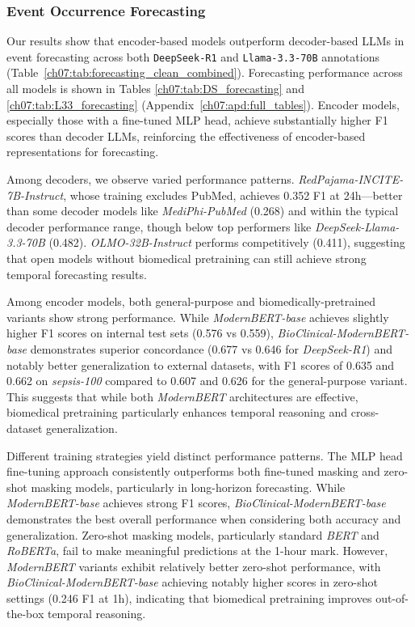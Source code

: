 \subsubsection{Event Occurrence Forecasting}\label{ch07:sec:event-results}

Our results show that encoder-based models outperform decoder-based LLMs in event forecasting across both \texttt{DeepSeek-R1} and \texttt{Llama-3.3-70B} annotations (Table~\ref{ch07:tab:forecasting_clean_combined}).
Forecasting performance across all models is shown in Tables \ref{ch07:tab:DS_forecasting} and \ref{ch07:tab:L33_forecasting} (Appendix~\ref{ch07:apd:full_tables}).
Encoder models, especially those with a fine-tuned MLP head, achieve substantially higher F1 scores than decoder LLMs, reinforcing the effectiveness of encoder-based representations for forecasting.



Among decoders, we observe varied performance patterns. \textit{RedPajama-INCITE-7B-Instruct}, whose training excludes PubMed, achieves 0.352 F1 at 24h---better than some decoder models like \textit{MediPhi-PubMed} (0.268) and within the typical decoder performance range, though below top performers like \textit{DeepSeek-Llama-3.3-70B} (0.482). \textit{OLMO-32B-Instruct} performs competitively (0.411), suggesting that open models without biomedical pretraining can still achieve strong temporal forecasting results.

Among encoder models, both general-purpose and biomedically-pretrained variants show strong performance.
While \textit{ModernBERT-base} achieves slightly higher F1 scores on internal test sets (0.576 vs 0.559), \textit{BioClinical-ModernBERT-base} demonstrates superior concordance (0.677 vs 0.646 for \textit{DeepSeek-R1}) and notably better generalization to external datasets, with F1 scores of 0.635 and 0.662 on \textit{sepsis-100} compared to 0.607 and 0.626 for the general-purpose variant.
This suggests that while both \textit{ModernBERT} architectures are effective, biomedical pretraining particularly enhances temporal reasoning and cross-dataset generalization.

Different training strategies yield distinct performance patterns.
The MLP head fine-tuning approach consistently outperforms both fine-tuned masking and zero-shot masking models, particularly in long-horizon forecasting.
While \textit{ModernBERT-base} achieves strong F1 scores, \textit{BioClinical-ModernBERT-base} demonstrates the best overall performance when considering both accuracy and generalization.
Zero-shot masking models, particularly standard \textit{BERT} and \textit{RoBERTa}, fail to make meaningful predictions at the 1-hour mark.
However, \textit{ModernBERT} variants exhibit relatively better zero-shot performance, with \textit{BioClinical-ModernBERT-base} achieving notably higher scores in zero-shot settings (0.246 F1 at 1h), indicating that biomedical pretraining improves out-of-the-box temporal reasoning.

